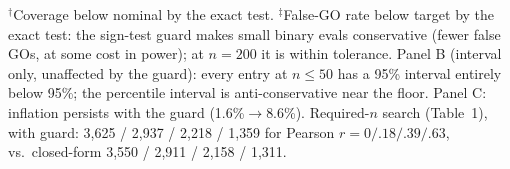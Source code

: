 \begin{table}[t]
\vspace{2pt}
\raggedright\scriptsize
$^\dagger$Coverage below nominal by the exact test. $^\ddagger$False-GO rate below target by the exact
test: the sign-test guard makes small binary evals conservative (fewer false GOs, at some cost in
power); at $n{=}200$ it is within tolerance. Panel B (interval only, unaffected by the guard): every
entry at $n\le 50$ has a 95\% interval entirely below 95\%; the percentile interval is
anti-conservative near the floor. Panel C: inflation persists with the guard (1.6\%$\to$8.6\%).
Required-$n$ search (Table~1), with guard: 3{,}625 / 2{,}937 / 2{,}218 / 1{,}359 for Pearson
$r = 0 / .18 / .39 / .63$, vs.\ closed-form 3{,}550 / 2{,}911 / 2{,}158 / 1{,}311.
\end{table}
